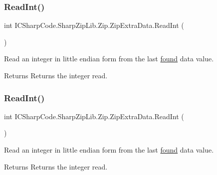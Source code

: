 \subsubsection{\texorpdfstring{Read\+Int()}{ReadInt()}\hspace{0.1cm}{\footnotesize\ttfamily [1/2]}}
{\footnotesize\ttfamily int I\+C\+Sharp\+Code.\+Sharp\+Zip\+Lib.\+Zip.\+Zip\+Extra\+Data.\+Read\+Int (\begin{DoxyParamCaption}{ }\end{DoxyParamCaption})\hspace{0.3cm}{\ttfamily [inline]}}



Read an integer in little endian form from the last \hyperlink{class_i_c_sharp_code_1_1_sharp_zip_lib_1_1_zip_1_1_zip_extra_data_a91e0c6c1d11967653256ccb161f9818c}{found} data value. 

\begin{DoxyReturn}{Returns}
Returns the integer read.
\end{DoxyReturn}
\mbox{\label{class_i_c_sharp_code_1_1_sharp_zip_lib_1_1_zip_1_1_zip_extra_data_a77039b5fe5d0c56be598b5eadb669a62}} 
\subsubsection{\texorpdfstring{Read\+Int()}{ReadInt()}\hspace{0.1cm}{\footnotesize\ttfamily [2/2]}}
{\footnotesize\ttfamily int I\+C\+Sharp\+Code.\+Sharp\+Zip\+Lib.\+Zip.\+Zip\+Extra\+Data.\+Read\+Int (\begin{DoxyParamCaption}{ }\end{DoxyParamCaption})\hspace{0.3cm}{\ttfamily [inline]}}



Read an integer in little endian form from the last \hyperlink{class_i_c_sharp_code_1_1_sharp_zip_lib_1_1_zip_1_1_zip_extra_data_a91e0c6c1d11967653256ccb161f9818c}{found} data value. 

\begin{DoxyReturn}{Returns}
Returns the integer read.
\end{DoxyReturn}
\mbox{\label{class_i_c_sharp_code_1_1_sharp_zip_lib_1_1_zip_1_1_zip_extra_data_a06f9836c2c567c9f223810d3e2d9b51c}} 
